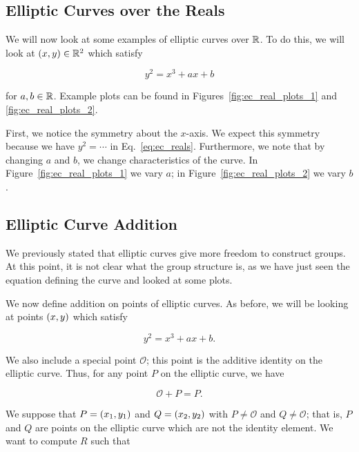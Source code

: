 \subsection{Elliptic Curves over the Reals}

We will now look at some examples of \glspl{elliptic curve} over $\mathbb{R}$.
To do this, we will look at $\left( x,y \right)\in\mathbb{R}^{2}$ which satisfy

\begin{equation}
    y^{2} = x^{3} + ax + b
    \label{eq:ec_reals}
\end{equation}

\noindent
for $a,b\in\mathbb{R}$.
Example plots can be found in Figures~\ref{fig:ec_real_plots_1}
and \ref{fig:ec_real_plots_2}.



First, we notice the symmetry about the $x$-axis.
We expect this symmetry because we have
$y^{2} = \cdots$ in Eq.~\eqref{eq:ec_reals}.
Furthermore, we note that by changing $a$ and $b$, we change characteristics
of the curve.
In Figure~\ref{fig:ec_real_plots_1} we vary $a$;
in Figure~\ref{fig:ec_real_plots_2} we vary $b$.

\subsection{Elliptic Curve Addition}
\label{ssec:math_elliptic_addition}

We previously stated that \glspl{elliptic curve} give more freedom
to construct \glspl{group}.
At this point, it is not clear what the \gls{group} structure is,
as we have just seen the equation defining the curve
and looked at some plots.

We now define addition on points of \glspl{elliptic curve}.
As before, we will be looking at points $\left( x,y \right)$ which satisfy

\begin{equation}
    y^{2} = x^{3} + ax + b.
    \label{eq:ec_addition}
\end{equation}

\noindent
We also include a special point $\mathcal{O}$;
this point is the additive identity on the \gls{elliptic curve}.
Thus, for any point $P$ on the \gls{elliptic curve},
we have

\begin{equation}
    \mathcal{O} + P = P.
\end{equation}

We suppose that $P = \left( x_{1},y_{1} \right)$
and $Q = \left( x_{2},y_{2} \right)$ with $P\ne\mathcal{O}$
and $Q\ne\mathcal{O}$;
that is, $P$ and $Q$ are points on the \gls{elliptic curve} which
are not the identity element.
We want to compute $R$ such that


